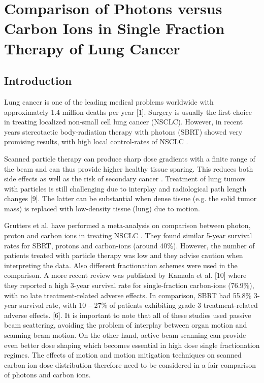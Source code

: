\documentclass[type=dr, dr=rernat, acm$^3$entcolor=tud7b,colorbacktitle, bigchapter, openright, twoside, 12pt ]{tudthesis}
\begin{document}
\chapter{Comparison of Photons versus Carbon Ions in Single Fraction Therapy of Lung Cancer}
\label{PatStudy}


\section{Introduction}

Lung cancer is one of the leading medical problems worldwide with approximately 1.4 million deaths per year [1]. Surgery is usually the first choice in treating localized non-small cell lung cancer (NSCLC). However, in recent years stereotactic body-radiation therapy with photons (SBRT) showed very promising results, with high local control-rates of NSCLC  \cite{Baumann2009, Fakiris2009, Grutters2010, Ricardi2010, Timmerman2010, Greco2011}.

Scanned particle therapy can produce sharp dose gradients with a finite range of the beam and can thus provide higher healthy tissue sparing. This reduces both side effects as well as the risk of secondary cancer \cite{Newhauser2011}. Treatment of lung tumors with particles is still challenging due to interplay and radiological path length changes [9]. The latter can be substantial when dense tissue (e.g. the solid tumor mass) is replaced with low-density tissue (lung) due to motion.

Grutters et al. have performed a meta-analysis on comparison between photon, proton and carbon ions in treating NSCLC \cite{Grutters2010}. They found similar 5-year survival rates for SBRT, protons and carbon-ions (around 40\%). However, the number of patients treated with particle therapy was low and they advise caution when interpreting the data. Also different fractionation schemes were used in the comparison. A more recent review was published by  Kamada et al. [10] where they reported a high 3-year survival rate for single-fraction carbon-ions (76.9\%), with no late treatment-related adverse effects. In comparison, SBRT had 55.8\% 3-year survival rate, with 10 – 27\% of patients exhibiting grade 3 treatment-related adverse effects. [6]. It is important to note that all of these studies used passive beam scattering, avoiding the problem of interplay between organ motion and scanning beam motion. On the other hand, active beam scanning can provide even better dose shaping which becomes essential in high dose single fractionation regimes. The effects of motion and motion mitigation techniques on scanned carbon ion dose distribution therefore need to be considered in a fair comparison of photons and carbon ions. 
\end{document}
